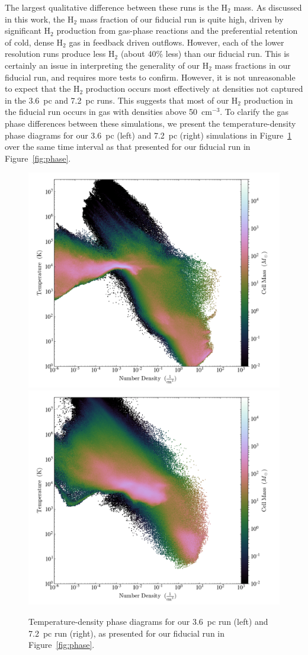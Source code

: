 \documentclass[twocolumn]{aastex61}
\begin{document}
The largest qualitative difference between these runs is the H$_2$ mass. As discussed in this work, the H$_2$ mass fraction of our fiducial run is quite high, driven by significant H$_2$ production from gas-phase reactions and the preferential retention of cold, dense H$_2$ gas in feedback driven outflows. However, each of the lower resolution runs produce less H$_2$ (about 40\% less) than our fiducial run. This is certainly an issue in interpreting the generality of our H$_2$ mass fractions in our fiducial run, and requires more tests to confirm. However, it is not unreasonable to expect that the H$_2$ production occurs most effectively at densities not captured in the 3.6~pc and 7.2~pc runs. This suggests that most of our H$_2$ production in the fiducial run occurs in gas with densities above 50~cm$^{-3}$. To clarify the gas phase differences between these simulations, we present the temperature-density phase diagrams for our 3.6~pc (left) and 7.2~pc (right) simulations in Figure~\ref{fig:phase_resolution} over the same time interval as that presented for our fiducial run in Figure~\ref{fig:phase}. 

\begin{figure}
\centering
\includegraphics[width=0.475\linewidth]{3pc_phase.png}
\includegraphics[width=0.475\linewidth]{6pc_phase.png}
\caption{Temperature-density phase diagrams for our 3.6~pc run (left) and 7.2~pc run (right), as presented for our fiducial run in Figure~\ref{fig:phase}.}
\label{fig:phase_resolution}
\end{figure}
\end{document}
